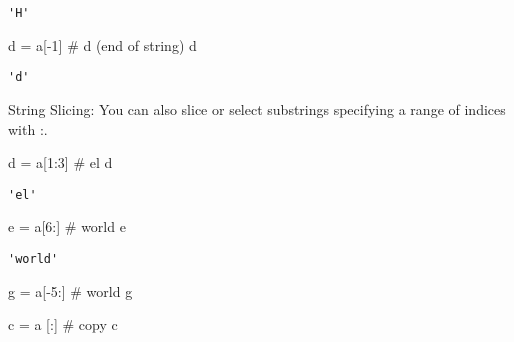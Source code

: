 \documentclass[
  letterpaper,
  DIV=11,
  numbers=noendperiod]{scrreprt}
\newenvironment{Shaded}{\begin{snugshade}}{\end{snugshade}}
\newcommand{\CommentTok}[1]{\textcolor[rgb]{0.37,0.37,0.37}{#1}}
\newcommand{\DecValTok}[1]{\textcolor[rgb]{0.68,0.00,0.00}{#1}}
\newcommand{\NormalTok}[1]{\textcolor[rgb]{0.00,0.46,0.62}{#1}}
\newcommand{\OperatorTok}[1]{\textcolor[rgb]{0.37,0.37,0.37}{#1}}
\begin{document}
\begin{verbatim}
'H'
\end{verbatim}

\begin{Shaded}
\begin{Highlighting}[]
\NormalTok{d }\OperatorTok{=}\NormalTok{ a[}\OperatorTok{{-}}\DecValTok{1}\NormalTok{]         }\CommentTok{\# \textquotesingle{}d\textquotesingle{} (end of string)}
\NormalTok{d}
\end{Highlighting}
\end{Shaded}

\begin{verbatim}
'd'
\end{verbatim}

String Slicing: You can also slice or select substrings specifying a
range of indices with :.

\begin{Shaded}
\begin{Highlighting}[]
\NormalTok{d }\OperatorTok{=}\NormalTok{ a[}\DecValTok{1}\NormalTok{:}\DecValTok{3}\NormalTok{]     }\CommentTok{\# \textquotesingle{}el\textquotesingle{}}
\NormalTok{d}
\end{Highlighting}
\end{Shaded}

\begin{verbatim}
'el'
\end{verbatim}

\begin{Shaded}
\begin{Highlighting}[]
\NormalTok{e }\OperatorTok{=}\NormalTok{ a[}\DecValTok{6}\NormalTok{:]     }\CommentTok{\# \textquotesingle{}world\textquotesingle{}}
\NormalTok{e}
\end{Highlighting}
\end{Shaded}

\begin{verbatim}
'world'
\end{verbatim}

\begin{Shaded}
\begin{Highlighting}[]
\NormalTok{g }\OperatorTok{=}\NormalTok{ a[}\OperatorTok{{-}}\DecValTok{5}\NormalTok{:]    }\CommentTok{\# \textquotesingle{}world\textquotesingle{}}
\NormalTok{g}
\end{Highlighting}
\end{Shaded}

\begin{Shaded}
\begin{Highlighting}[]
\NormalTok{c }\OperatorTok{=}\NormalTok{  a [:] }\CommentTok{\# copy}
\NormalTok{c}
\end{Highlighting}
\end{Shaded}
\end{document}
